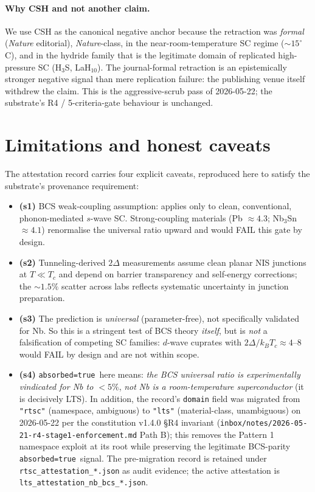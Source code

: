 \documentclass[11pt,a4paper]{article}
\newcommand{\absorbedtrue}{\textcolor{honestgreen}{\texttt{absorbed=true}}}
\begin{document}
\paragraph{Why CSH and not another claim.}
We use CSH as the canonical negative anchor because the retraction
was \emph{formal} (\emph{Nature} editorial), \emph{Nature}-class, in
the near-room-temperature SC regime ($\sim 15^{\circ}$C), and in the
hydride family that is the legitimate domain of replicated
high-pressure SC (H$_3$S, LaH$_{10}$). The journal-formal retraction
is an epistemically stronger negative signal than mere replication
failure: the publishing venue itself withdrew the claim. This is the
aggressive-scrub pass of 2026-05-22; the substrate's R4 /
5-criteria-gate behaviour is unchanged.

\section{Limitations and honest caveats}
\label{sec:limits}

The attestation record carries four explicit caveats, reproduced here
to satisfy the substrate's provenance requirement:

\begin{itemize}\itemsep0.3em
\item \textbf{(s1)} BCS weak-coupling assumption: applies only to clean,
  conventional, phonon-mediated $s$-wave SC. Strong-coupling materials
  (Pb \(\approx 4.3\); Nb$_{3}$Sn \(\approx 4.1\)) renormalise the
  universal ratio upward and would FAIL this gate by design.
\item \textbf{(s2)} Tunneling-derived \(2\Delta\) measurements assume
  clean planar NIS junctions at \(T \ll T_{c}\) and depend on barrier
  transparency and self-energy corrections; the \(\sim 1.5\%\) scatter
  across labs reflects systematic uncertainty in junction preparation.
\item \textbf{(s3)} The prediction is \emph{universal} (parameter-free),
  not specifically validated for Nb. So this is a stringent test of
  BCS theory \emph{itself}, but is \emph{not} a falsification of
  competing SC families: $d$-wave cuprates with \(2\Delta/k_{B}T_{c}
  \approx 4\text{--}8\) would FAIL by design and are not within scope.
\item \textbf{(s4)} \absorbedtrue\ here means: \emph{the BCS universal
  ratio is experimentally vindicated for Nb to \(<5\%\)}, \emph{not}
  \emph{Nb is a room-temperature superconductor} (it is decisively LTS).
  In addition, the record's \texttt{domain} field was migrated from
  \texttt{"rtsc"} (namespace, ambiguous) to \texttt{"lts"} (material-class,
  unambiguous) on 2026-05-22 per the constitution v1.4.0 \S R4 invariant
  (\texttt{inbox/notes/2026-05-21-r4-stage1-enforcement.md} Path B);
  this removes the Pattern 1 namespace exploit at its root while
  preserving the legitimate BCS-parity \absorbedtrue\ signal. The
  pre-migration record is retained under \texttt{rtsc\_attestation\_*.json}
  as audit evidence; the active attestation is
  \texttt{lts\_attestation\_nb\_bcs\_*.json}.
\end{itemize}
\end{document}
